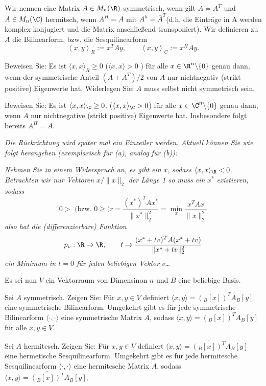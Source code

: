\begin{Problem}
	Wir nennen eine Matrix $A\in M_n(\R)$ symmetrisch, wenn gilt $A=A^T$ und $A\in M_n(\C)$ hermitsch, wenn $A^H=A$ mit $A^h=\overline{A}^T$(d.h. die Einträge in A werden komplex konjugiert und die Matrix anschließend transponiert). Wir definieren zu $A$ die Bilinearform, bzw. die Sesquilinearform 
	\[
	\left<x,y \right>_R:=x^TAy,\qquad \left<x,y \right>_C:=x^HAy
	.\] 
	\begin{parts}
		\item Beweisen Sie: Es ist $\langle x, x\rangle_R\ge 0$ ($\langle x,x\rangle>0$ ) f\"{u}r alle $x\in \R^n \backslash \{0\} $ genau dann, wenn der symmetrische Anteil $(A+A^T) / 2$ von $A$ nur nichtnegativ (strikt positive) Eigenwerte hat. Widerlegen Sie: $A$ muss selbst nicht symmetrisch sein.
	\item Beweisen Sie: Es ist $\langle x,x\rangle_\C\ge 0$. ($\langle x,x\rangle_\C>0$) f\"{u}r alle $x\in \C^n\backslash \{0\} $ genau dann, wenn $A$ nur nichtnegative (strikt positive) Eigenwerte hat. Insbesondere folgt bereits $A^H=A$.
	
		{\footnotesize\emph{Die Rückrichtung wird später mal ein Einzeiler werden. Aktuell können Sie wie folgt herangehen (exemplarisch für (a), analog für (b)):}
		
		\emph{Nehmen Sie in einem Widerspruch an, es gibt ein} $x$, \emph{sodass} $\langle x,x\rangle_{\R}<0$. \emph{Betrachten wir nur Vektoren} $x / \|x\|_2$ \emph{der Länge 1 so muss ein }$x^*$ \emph{existieren, sodass}
		\[
		0>\text{ (bzw. }0\ge\text{)}r=\frac{(x^{*})^TAx^*}{\|x^*\|_2^2}=\min_x \frac{x^TAx}{\|x\|_2^2}
		\] 
		\emph{also hat die (differenzierbare) Funktion}
		\[
		p_v:\R\to \R,\qquad t\to \frac{(x^*+tv)^TA(x^*+tv)}{\|x^*+tv\|_2^2}
		\]
		\emph{ein Minimum in $t=0$ f\"{u}r jeden beliebigen Vektor} $v$\ldots}
	
		Es sei nun $V$ ein Vektorraum von Dimensinon $n$ und $B$ eine beliebige Basis.
	\item Sei $A$ symmetrisch. Zeigen Sie: F\"{u}r $x,y\in V$ definiert $\langle x,y\rangle=({}_B[x])^TA{}_B[y]$ eine symmetrische Bilinearform. Umgekehrt gibt es f\"{u}r jede symmetrische Bilinearform $\langle\cdot,\cdot\rangle$ eine symmetrische Matrix $A$, sodass $\langle x,y\rangle=({}_B[x])^TA{}_B[y]$ f\"{u}r alle $x,y\in V$.
	\item Sei $A$ hermitesch. Zeigen Sie: F\"{u}r $x,y\in V$ definiert $\langle x,y\rangle=\overline{({}_B[x])^T}A{}_B[y]$ eine hermetische Sesquilinearform. Umgekehrt gibt es f\"{u}r jede hermitesche Sesquilinearform $\langle\cdot,\cdot\rangle$ eine hermitesche Matrix $A$, sodass $\langle x,y\rangle=\overline{({}_B[x])^T}A{}_B[y]$.
	\end{parts}
\end{Problem}
